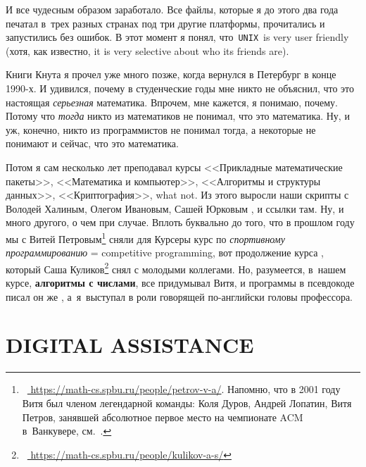 \documentclass[intlimits,twoside,a4paper,11pt]{article}
\begin{document}
	И все чудесным образом заработало. Все файлы, которые я до этого 
	два года печатал в~трех разных странах под три другие платформы, прочитались
	и запустились без ошибок. В этот момент я понял, что \,{\tt UNIX}\, is very user friendly 
	(хотя, как известно, it is very selective about who its friends are).
	
	
	Книги Кнута \cite{K1, K2, K3} я прочел уже много позже, когда вернулся 
	в Петербург в конце 1990-х. И удивился, почему в студенческие годы мне никто не 
	объяснил, что это настоящая {\it серьезная\/} математика. Впрочем, мне
	кажется, я понимаю, почему. Потому что {\it тогда\/} никто из математиков не 
	понимал, что это математика. Ну, и уж, конечно, никто из программистов 
	не понимал тогда, а некоторые не понимают и сейчас, что это математика.  
	
	Потом я сам несколько лет преподавал курсы <<Прикладные математические пакеты>>, 
	<<Математика и компьютер>>, <<Алгоритмы и структуры данных>>, <<Криптография>>, 
	what not.
	Из этого выросли наши скрипты с Володей Халиным, Олегом Ивановым, Сашей
	Юрковым \cite{VILH, VHY}, и ссылки там. Ну, и много другого, о чем при случае. 		
		Вплоть буквально до того, что в прошлом году мы с Витей Петровым\footnote{~\url{ 
				https://math-cs.spbu.ru/people/petrov-v-a/}. Напомню, что в 2001 году Витя был 
			членом легендарной команды: Коля Дуров, Андрей Лопатин, Витя Петров, занявшей
			абсолютное первое место на чемпионате ACM в~Ванкувере, см.~\cite{AP}.} сняли 
		для Курсеры курс по
		{\it спортивному программированию\/} = competitive programming, вот
		продолжение курса \cite{KLST}, который Саша Куликов\footnote{~\url{  
				https://math-cs.spbu.ru/people/kulikov-a-s/}} снял с молодыми коллегами.
		Но, разумеется, в~нашем курсе, {\bf алгоритмы с числами}, все 
		придумывал Витя, и программы в псевдокоде писал он же \cite{PP}, а~я~выступал   
		в роли говорящей по-английски головы профессора.
		
		
		\section{DIGITAL ASSISTANCE}
		
\end{document}
